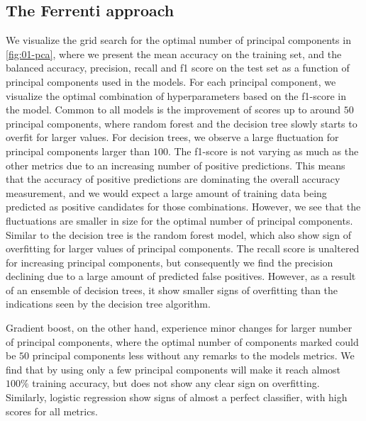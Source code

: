 \clearpage
\subsection{The Ferrenti approach}

We visualize the grid search for the optimal number of principal components in \autoref{fig:01-pca}, where we present the mean accuracy on the training set, and the balanced accuracy, precision, recall and f1 score on the test set as a function of principal components used in the models. For each principal component, we visualize the optimal combination of hyperparameters based on the f1-score in the model. Common to all models is the improvement of scores up to around $50$ principal components, where random forest and the decision tree slowly starts to overfit for larger values. For decision trees, we observe a large fluctuation for principal components larger than $100$. The f1-score is not varying as much as the other metrics due to an increasing number of positive predictions. This means that the accuracy of positive predictions are dominating the overall accuracy measurement, and we would expect a large amount of training data being predicted as positive candidates for those combinations. However, we see that the fluctuations are smaller in size for the optimal number of principal components. Similar to the decision tree is the random forest model, which also show sign of overfitting for larger values of principal components. The recall score is unaltered for increasing principal components, but consequently we find the precision declining due to a large amount of predicted false positives.  However, as a result of an ensemble of decision trees, it show smaller signs of overfitting than the indications seen by the decision tree algorithm.

Gradient boost, on the other hand, experience minor changes for larger number of principal components, where the optimal number of components marked could be $50$ principal components less without any remarks to the models metrics. We find that by using only a few principal components will make it reach almost $100\%$ training accuracy, but does not show any clear sign on overfitting. Similarly, logistic regression show signs of almost a perfect classifier, with high scores for all metrics.

